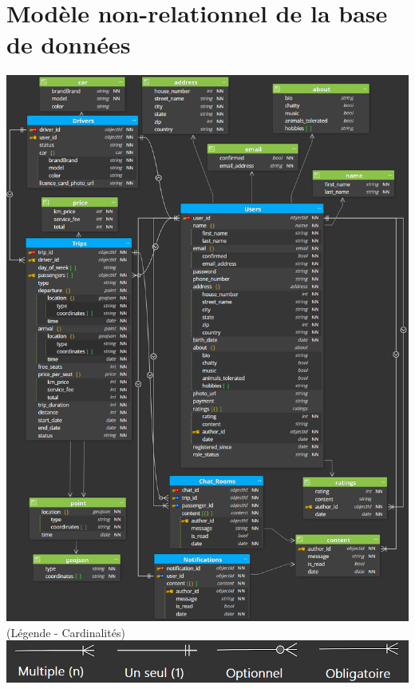 \section{Modèle non-relationnel de la base de données}
\label{Modèle non-relationnel de la base de données}
\begin{center}
\includegraphics[width=\linewidth]{medias/db-structure.png}
(Légende - Cardinalités)
\includegraphics[width=\linewidth]{medias/db-legende.png}
\end{center}

